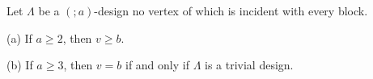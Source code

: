 Let $\Lambda$ be a $(; a)$-design no vertex of which is incident with every block.

(a) If $a \geq 2$, then $v \geq b$.

(b) If $a \geq 3$, then $v = b$ if and only if $\Lambda$ is a trivial design.
